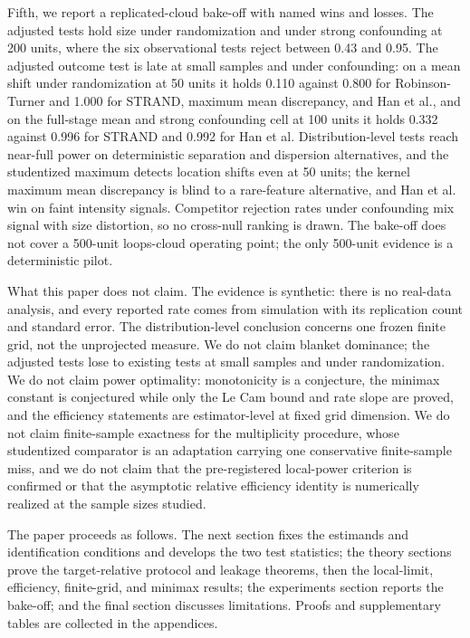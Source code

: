 Fifth, we report a replicated-cloud bake-off with named wins and losses. The adjusted tests hold size under randomization and under strong confounding at 200 units, where the six observational tests reject between 0.43 and 0.95. The adjusted outcome test is late at small samples and under confounding: on a mean shift under randomization at 50 units it holds 0.110 against 0.800 for Robinson-Turner and 1.000 for STRAND, maximum mean discrepancy, and Han et al., and on the full-stage mean and strong confounding cell at 100 units it holds 0.332 against 0.996 for STRAND and 0.992 for Han et al. Distribution-level tests reach near-full power on deterministic separation and dispersion alternatives, and the studentized maximum detects location shifts even at 50 units; the kernel maximum mean discrepancy is blind to a rare-feature alternative, and Han et al. win on faint intensity signals. Competitor rejection rates under confounding mix signal with size distortion, so no cross-null ranking is drawn. The bake-off does not cover a 500-unit loops-cloud operating point; the only 500-unit evidence is a deterministic pilot.

What this paper does not claim. The evidence is synthetic: there is no real-data analysis, and every reported rate comes from simulation with its replication count and standard error. The distribution-level conclusion concerns one frozen finite grid, not the unprojected measure. We do not claim blanket dominance; the adjusted tests lose to existing tests at small samples and under randomization. We do not claim power optimality: monotonicity is a conjecture, the minimax constant is conjectured while only the Le Cam bound and rate slope are proved, and the efficiency statements are estimator-level at fixed grid dimension. We do not claim finite-sample exactness for the multiplicity procedure, whose studentized comparator is an adaptation carrying one conservative finite-sample miss, and we do not claim that the pre-registered local-power criterion is confirmed or that the asymptotic relative efficiency identity is numerically realized at the sample sizes studied.

The paper proceeds as follows. The next section fixes the estimands and identification conditions and develops the two test statistics; the theory sections prove the target-relative protocol and leakage theorems, then the local-limit, efficiency, finite-grid, and minimax results; the experiments section reports the bake-off; and the final section discusses limitations. Proofs and supplementary tables are collected in the appendices.


